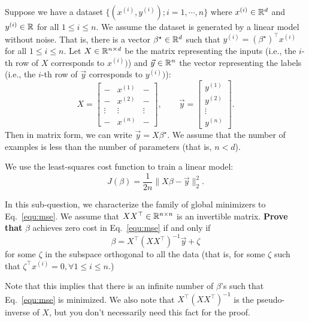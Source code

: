 \item{} Suppose we have a dataset $\{(x^{(i)}, y^{(i)});i=1,\cdots,n\}$ where $x^{(i)}\in \mathbb{R}^{d}$ and $y^{(i)}\in \mathbb{R}$ for all $1\le i\le n.$ We assume the dataset is generated by a linear model without noise. That is, there is a vector $\beta^\star\in\mathbb{R}^{d}$ such that $y^{(i)}=(\beta^\star)^\top x^{(i)}$ for all $1\le i\le n$. Let $X\in \mathbb{R}^{n\times d}$ be the matrix representing the inputs (i.e., the $i$-th row of $X$ corresponds to $x^{(i)})$) and $\vec{y}\in\mathbb{R}^{n}$ the vector representing the labels (i.e., the $i$-th row of $\vec{y}$ corresponds to $y^{(i)})$):
$$
	X=
\begin{bmatrix}
	- & x^{(1)} & - \\
	- & x^{(2)} & - \\
	\vdots & \vdots & \vdots\\
	- & x^{(n)} & - 
\end{bmatrix},\qquad
\vec{y}=
\begin{bmatrix}
y^{(1)} \\
y^{(2)}\\
\vdots\\
y^{(n)}
\end{bmatrix}.
$$
Then in matrix form, we can write $\vec{y}=X\beta^\star.$
We assume that the number of examples is less than the number of parameters (that is, $n<d$).

We use the least-squares cost function to train a linear model:
\begin{equation}\label{equ:mse}
	J(\beta)=\frac{1}{2n}\|X\beta-\vec{y}\|_2^2.
\end{equation}

In this sub-question, we characterize the family of global minimizers to Eq.~\eqref{equ:mse}. We assume that $X X^\top\in \mathbb{R}^{n\times n}$ is an invertible matrix. \textbf{Prove that} $\beta$ achieves zero cost in Eq.~\eqref{equ:mse} if and only if 
\begin{equation}\label{equ:ir2}
	\beta=X^\top (XX^\top)^{-1}\vec{y}+\zeta
\end{equation} for some $\zeta$ in the subspace orthogonal to all the data (that is, for some $\zeta$ such that $\zeta^\top x^{(i)}=0,\forall 1\le i\le n.$) 

Note that this implies that there is an infinite number of $\beta$'s such that Eq.~\eqref{equ:mse} is minimized. We also note that $X^\top (XX^\top)^{-1}$ is the pseudo-inverse of $X$, but you don't necessarily need this fact for the proof.

